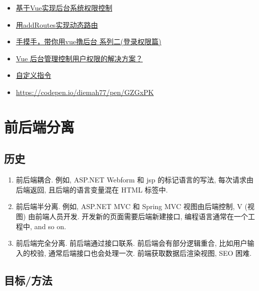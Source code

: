 \begin{itemize}
\tightlist
\item
  \href{http://refined-x.com/2017/08/29/\%E5\%9F\%BA\%E4\%BA\%8EVue\%E5\%AE\%9E\%E7\%8E\%B0\%E5\%90\%8E\%E5\%8F\%B0\%E7\%B3\%BB\%E7\%BB\%9F\%E6\%9D\%83\%E9\%99\%90\%E6\%8E\%A7\%E5\%88\%B6/}{基于Vue实现后台系统权限控制}
\item
  \href{http://refined-x.com/2017/09/01/\%E7\%94\%A8addRoutes\%E5\%AE\%9E\%E7\%8E\%B0\%E5\%8A\%A8\%E6\%80\%81\%E8\%B7\%AF\%E7\%94\%B1/}{用addRoutes实现动态路由}
\item
  \href{https://juejin.im/post/591aa14f570c35006961acac}{手摸手，带你用vue撸后台
  系列二(登录权限篇)}
\item
  \href{https://www.zhihu.com/question/58991978}{Vue
  后台管理控制用户权限的解决方案？}
\item
  \href{https://cn.vuejs.org/v2/guide/custom-directive.html}{自定义指令}
\item
  \url{https://codepen.io/diemah77/pen/GZGxPK}
\end{itemize}

\section{前后端分离}\label{ux524dux540eux7aefux5206ux79bb}

\subsection{历史}\label{ux5386ux53f2}

\begin{enumerate}
\def\labelenumi{\arabic{enumi}.}
\tightlist
\item
  前后端耦合. 例如, ASP.NET Webform 和 jsp 的标记语言的写法,
  每次请求由后端返回, 且后端的语言变量混在 HTML 标签中.
\item
  前后端半分离. 例如, ASP.NET MVC 和 Spring MVC 视图由后端控制, V (视图)
  由前端人员开发. 开发新的页面需要后端新建接口,
  编程语言通常在一个工程中, and so on.
\item
  前后端完全分离. 前后端通过接口联系. 前后端会有部分逻辑重合,
  比如用户输入的校验, 通常后端接口也会处理一次. 前端获取数据后渲染视图,
  SEO 困难.
\end{enumerate}

\subsection{目标/方法}\label{ux76eeux6807ux65b9ux6cd5}

